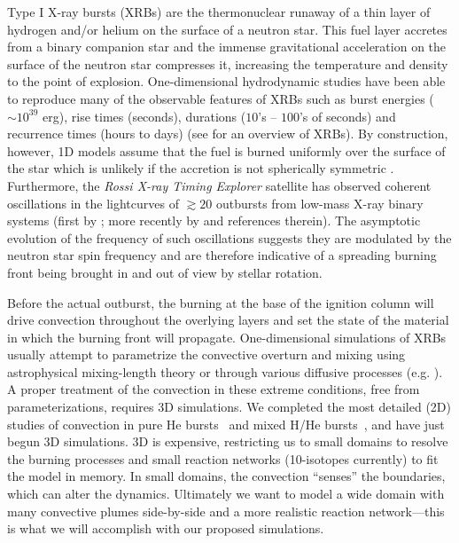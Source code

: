 Type I X-ray bursts (XRBs) are the thermonuclear runaway of a thin
layer of hydrogen and/or helium on the surface of a neutron star. 
This fuel layer accretes from a binary companion star and the immense
gravitational acceleration on the surface of the neutron star
compresses it, increasing the temperature and density to the point of
explosion.  One-dimensional hydrodynamic studies have been able to
reproduce many of the observable features of XRBs such as burst
energies ($\sim 10^{39}$ erg), rise times (seconds), durations ($10$'s
-- $100$'s of seconds) and recurrence times (hours to days) (see
\cite{STRO_BILD06} for an overview of XRBs).  By construction,
however, 1D models assume that the fuel is burned
uniformly over the surface of the star which is unlikely if the
accretion is not spherically symmetric \cite{SHARA82}.  Furthermore,
the {\em Rossi X-ray Timing Explorer} satellite has observed coherent
oscillations in the lightcurves of $\gtrsim 20$ outbursts from low-mass
X-ray binary
systems (first by \cite{STRO_ETAL96}; more recently by
\cite{ALTAMIRANO_ETAL10} and references therein).  The asymptotic
evolution of the frequency of such oscillations suggests they are
modulated by the neutron star spin frequency \cite{MUNO_ETAL02} and
are therefore indicative of a spreading burning front being brought in
and out of view by stellar rotation.

Before the actual outburst, the burning at the base of the ignition
column will drive convection throughout the overlying layers and set
the state of the material in which the burning front will propagate.
One-dimensional simulations of XRBs usually attempt to parametrize the
convective overturn and mixing using astrophysical mixing-length
theory or through various diffusive processes
(e.g. \cite{HEGER_ETAL00}).  A proper treatment of the convection in
these extreme conditions, free from parameterizations, requires 3D
simulations.  We completed the most detailed (2D) studies of
convection in pure He bursts~\cite{XRB-paper} and mixed H/He
bursts~\cite{XRB2}, and have just begun 3D simulations.  3D is
expensive, restricting us to small domains to resolve the burning
processes and small reaction networks (10-isotopes currently) to fit
the model in memory.  In small domains, the convection ``senses'' 
the boundaries, which can alter the dynamics.  Ultimately we want
to model a wide domain with many convective plumes side-by-side
and a more realistic reaction network---this is what we will
accomplish with our proposed simulations.

